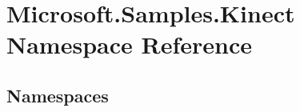 \hypertarget{namespace_microsoft_1_1_samples_1_1_kinect}{}\section{Microsoft.\+Samples.\+Kinect Namespace Reference}
\label{namespace_microsoft_1_1_samples_1_1_kinect}
\subsection*{Namespaces}
\begin{DoxyCompactItemize}
\end{DoxyCompactItemize}

